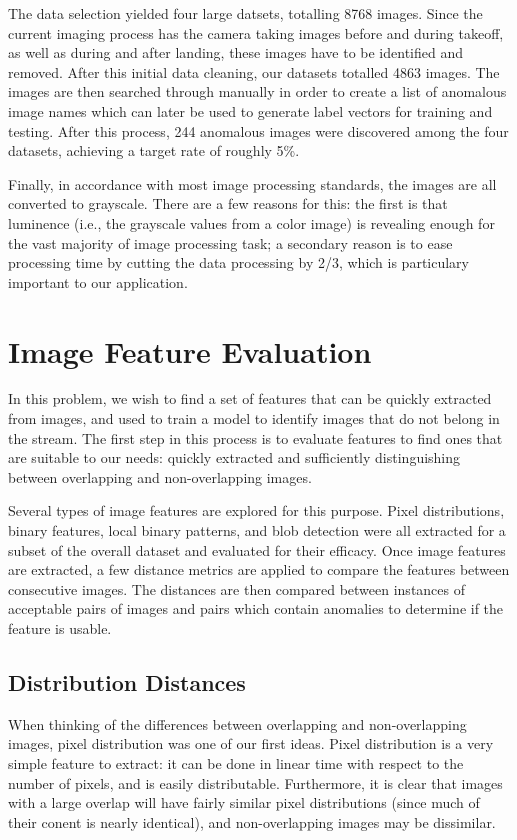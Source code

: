 The data selection yielded four large datsets, totalling 8768 images.
Since the current imaging process has the camera taking images before and during takeoff, as well as during and after landing, these images have to be identified and removed.
After this initial data cleaning, our datasets totalled 4863 images.
The images are then searched through manually in order to create a list of anomalous image names which can later be used to generate label vectors for training and testing.
After this process, 244 anomalous images were discovered among the four datasets, achieving a target rate of roughly 5\%.

Finally, in accordance with most image processing standards, the images are all converted to grayscale.
There are a few reasons for this: the first is that luminence (i.e., the grayscale values from a color image) is revealing enough for the vast majority of image processing task; a secondary reason is to ease processing time by cutting the data processing by 2/3, which is particulary important to our application.


\section{Image Feature Evaluation}

In this problem, we wish to find a set of features that can be quickly extracted from images, and used to train a model to identify images that do not belong in the stream.
The first step in this process is to evaluate features to find ones that are suitable to our needs: quickly extracted and sufficiently distinguishing between overlapping and non-overlapping images.

Several types of image features are explored for this purpose.
Pixel distributions, binary features, local binary patterns, and blob detection were all extracted for a subset of the overall dataset and evaluated for their efficacy.
Once image features are extracted, a few distance metrics are applied to compare the features between consecutive images.
The distances are then compared between instances of acceptable pairs of images and pairs which contain anomalies to determine if the feature is usable.


\subsection{Distribution Distances}

When thinking of the differences between overlapping and non-overlapping images, pixel distribution was one of our first ideas.
Pixel distribution is a very simple feature to extract: it can be done in linear time with respect to the number of pixels, and is easily distributable.
Furthermore, it is clear that images with a large overlap will have fairly similar pixel distributions (since much of their conent is nearly identical), and non-overlapping images may be dissimilar.

